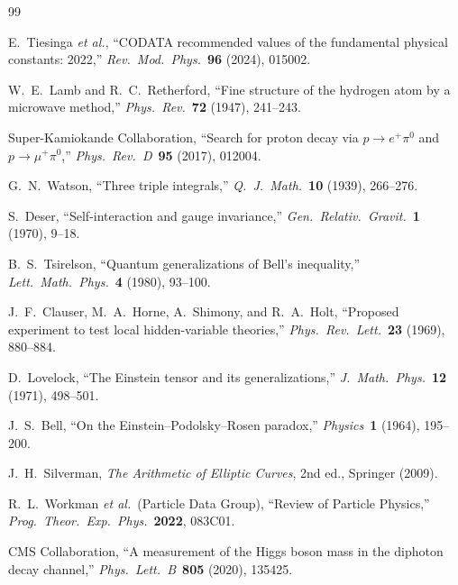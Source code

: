 \documentclass[12pt]{article}
\theoremstyle{compact}
\begin{document}
\begin{thebibliography}{99}

 E.~Tiesinga \textit{et al.}, ``CODATA recommended values of the fundamental physical constants: 2022,'' \textit{Rev.\ Mod.\ Phys.}\ \textbf{96} (2024), 015002.

 W.~E.~Lamb and R.~C.~Retherford, ``Fine structure of the hydrogen atom by a microwave method,'' \textit{Phys.\ Rev.}\ \textbf{72} (1947), 241--243.

 Super-Kamiokande Collaboration, ``Search for proton decay via $p \to e^+\pi^0$ and $p \to \mu^+\pi^0$,'' \textit{Phys.\ Rev.\ D}\ \textbf{95} (2017), 012004.

 G.~N.~Watson, ``Three triple integrals,'' \textit{Q.\ J.\ Math.}\ \textbf{10} (1939), 266--276.

 S.~Deser, ``Self-interaction and gauge invariance,'' \textit{Gen.\ Relativ.\ Gravit.}\ \textbf{1} (1970), 9--18.

 B.~S.~Tsirelson, ``Quantum generalizations of Bell's inequality,'' \textit{Lett.\ Math.\ Phys.}\ \textbf{4} (1980), 93--100.

 J.~F.~Clauser, M.~A.~Horne, A.~Shimony, and R.~A.~Holt, ``Proposed experiment to test local hidden-variable theories,'' \textit{Phys.\ Rev.\ Lett.}\ \textbf{23} (1969), 880--884.

 D.~Lovelock, ``The Einstein tensor and its generalizations,'' \textit{J.\ Math.\ Phys.}\ \textbf{12} (1971), 498--501.

 J.~S.~Bell, ``On the Einstein--Podolsky--Rosen paradox,'' \textit{Physics}\ \textbf{1} (1964), 195--200.

 J.~H.~Silverman, \textit{The Arithmetic of Elliptic Curves}, 2nd ed., Springer (2009).

 R.~L.~Workman \textit{et al.}\ (Particle Data Group), ``Review of Particle Physics,'' \textit{Prog.\ Theor.\ Exp.\ Phys.}\ \textbf{2022}, 083C01.

 CMS Collaboration, ``A measurement of the Higgs boson mass in the diphoton decay channel,'' \textit{Phys.\ Lett.\ B}\ \textbf{805} (2020), 135425.

\end{thebibliography}
\end{document}
